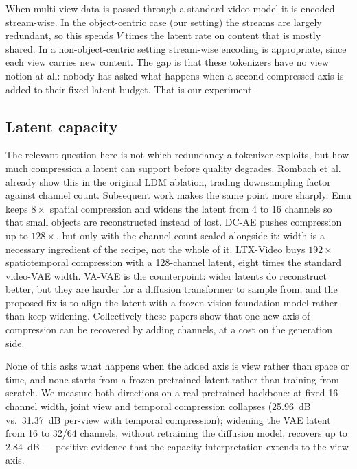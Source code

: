 When multi-view data is passed through a standard video model it is encoded stream-wise. In the object-centric case (our setting) the streams are largely redundant, so this spends $V$ times the latent rate on content that is mostly shared. In a non-object-centric setting stream-wise encoding is appropriate, since each view carries new content. The gap is that these tokenizers have no view notion at all: nobody has asked what happens when a second compressed axis is added to their fixed latent budget. That is our experiment.

\subsection{Latent capacity}

The relevant question here is not which redundancy a tokenizer exploits, but how much compression a latent can support before quality degrades. Rombach et al.\ \cite{rombach2022high} already show this in the original LDM ablation, trading downsampling factor against channel count. Subsequent work makes the same point more sharply. Emu \cite{dai2023emu} keeps $8\times$ spatial compression and widens the latent from 4 to 16 channels so that small objects are reconstructed instead of lost. DC-AE \cite{chen2024deep} pushes compression up to $128\times$, but only with the channel count scaled alongside it: width is a necessary ingredient of the recipe, not the whole of it. LTX-Video \cite{hacohen2024ltx} buys $192\times$ spatiotemporal compression with a 128-channel latent, eight times the standard video-VAE width. VA-VAE \cite{yao2025vavae} is the counterpoint: wider latents do reconstruct better, but they are harder for a diffusion transformer to sample from, and the proposed fix is to align the latent with a frozen vision foundation model rather than keep widening. Collectively these papers show that one new axis of compression can be recovered by adding channels, at a cost on the generation side.

None of this asks what happens when the added axis is view rather than space or time, and none starts from a frozen pretrained latent rather than training from scratch. We measure both directions on a real pretrained backbone: at fixed 16-channel width, joint view and temporal compression collapses (25.96~dB vs.\ 31.37~dB per-view with temporal compression); widening the VAE latent from 16 to 32/64 channels, without retraining the diffusion model, recovers up to 2.84~dB --- positive evidence that the capacity interpretation extends to the view axis.

